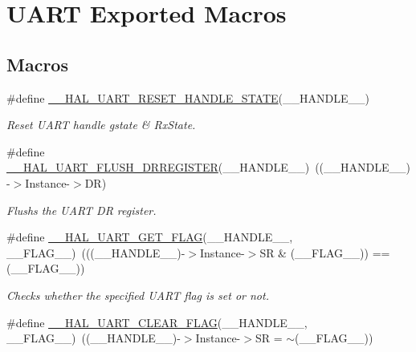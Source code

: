 \hypertarget{group___u_a_r_t___exported___macros}{}\section{U\+A\+RT Exported Macros}
\label{group___u_a_r_t___exported___macros}
\subsection*{Macros}
\begin{DoxyCompactItemize}
\item 
\#define \hyperlink{group___u_a_r_t___exported___macros_ga19deab848407b106998416c78092fa9b}{\+\_\+\+\_\+\+H\+A\+L\+\_\+\+U\+A\+R\+T\+\_\+\+R\+E\+S\+E\+T\+\_\+\+H\+A\+N\+D\+L\+E\+\_\+\+S\+T\+A\+TE}(\+\_\+\+\_\+\+H\+A\+N\+D\+L\+E\+\_\+\+\_\+)
\begin{DoxyCompactList}\small\item\em Reset U\+A\+RT handle gstate \& Rx\+State. \end{DoxyCompactList}\item 
\#define \hyperlink{group___u_a_r_t___exported___macros_gafc4f20cb0f29ba146c9bc14167c52744}{\+\_\+\+\_\+\+H\+A\+L\+\_\+\+U\+A\+R\+T\+\_\+\+F\+L\+U\+S\+H\+\_\+\+D\+R\+R\+E\+G\+I\+S\+T\+ER}(\+\_\+\+\_\+\+H\+A\+N\+D\+L\+E\+\_\+\+\_\+)~((\+\_\+\+\_\+\+H\+A\+N\+D\+L\+E\+\_\+\+\_\+)-\/$>$Instance-\/$>$DR)
\begin{DoxyCompactList}\small\item\em Flushs the U\+A\+RT DR register. \end{DoxyCompactList}\item 
\#define \hyperlink{group___u_a_r_t___exported___macros_ga261fe8a2afe84ec048113654266c5bf6}{\+\_\+\+\_\+\+H\+A\+L\+\_\+\+U\+A\+R\+T\+\_\+\+G\+E\+T\+\_\+\+F\+L\+AG}(\+\_\+\+\_\+\+H\+A\+N\+D\+L\+E\+\_\+\+\_\+,  \+\_\+\+\_\+\+F\+L\+A\+G\+\_\+\+\_\+)~(((\+\_\+\+\_\+\+H\+A\+N\+D\+L\+E\+\_\+\+\_\+)-\/$>$Instance-\/$>$SR \& (\+\_\+\+\_\+\+F\+L\+A\+G\+\_\+\+\_\+)) == (\+\_\+\+\_\+\+F\+L\+A\+G\+\_\+\+\_\+))
\begin{DoxyCompactList}\small\item\em Checks whether the specified U\+A\+RT flag is set or not. \end{DoxyCompactList}\item 
\#define \hyperlink{group___u_a_r_t___exported___macros_ga9bd035161d41cde4f2568c7af06493bf}{\+\_\+\+\_\+\+H\+A\+L\+\_\+\+U\+A\+R\+T\+\_\+\+C\+L\+E\+A\+R\+\_\+\+F\+L\+AG}(\+\_\+\+\_\+\+H\+A\+N\+D\+L\+E\+\_\+\+\_\+,  \+\_\+\+\_\+\+F\+L\+A\+G\+\_\+\+\_\+)~((\+\_\+\+\_\+\+H\+A\+N\+D\+L\+E\+\_\+\+\_\+)-\/$>$Instance-\/$>$SR = $\sim$(\+\_\+\+\_\+\+F\+L\+A\+G\+\_\+\+\_\+))

\end{DoxyCompactItemize}
